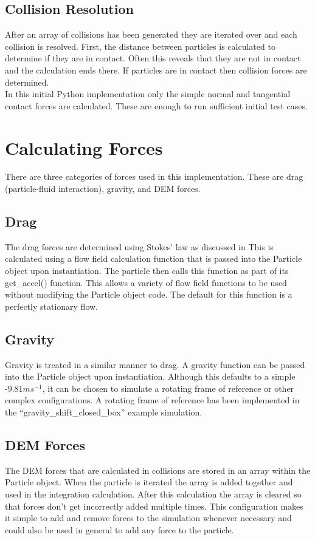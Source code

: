 \documentclass[10pt,a4paper,titlepage]{report}
\begin{document}
\subsection{Collision Resolution}
After an array of collisions has been generated they are iterated over and each collision is resolved. First, the distance between particles is calculated to determine if they are in contact. Often this reveals that they are not in contact and the calculation ends there. If particles are in contact then collision forces are determined.
\\In this initial Python implementation only the simple normal and tangential contact forces are calculated. These are enough to run sufficient initial test cases.
\section{Calculating Forces}
There are three categories of forces used in this implementation. These are drag (particle-fluid interaction), gravity, and DEM forces.
\subsection{Drag}
The drag forces are determined using Stokes' law as discussed in %
This is calculated using a flow field calculation function that is passed into the Particle object upon instantiation. The particle then calls this function as part of its get\_accel() function. This allows a variety of flow field functions to be used without modifying the Particle object code. The default for this function is a perfectly stationary flow.
\subsection{Gravity}
Gravity is treated in a similar manner to drag. A gravity function can be passed into the Particle object upon instantiation. Although this defaults to a simple -9.81$ms^{-1}$, it can be chosen to simulate a rotating frame of reference or other complex configurations. A rotating frame of reference has been implemented in the ``gravity\_shift\_closed\_box'' example simulation. %
\subsection{DEM Forces}
The DEM forces that are calculated in collisions are stored in an array within the Particle object. When the particle is iterated the array is added together and used in the integration calculation. After this calculation the array is cleared so that forces don't get incorrectly added multiple times. This configuration makes it simple to add and remove forces to the simulation whenever necessary and could also be used in general to add any force to the particle.
\end{document}
